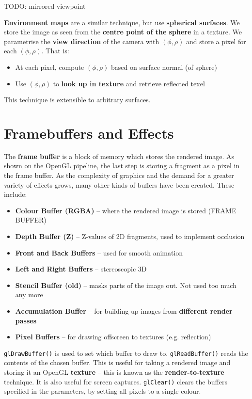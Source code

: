 \documentclass{article}
\begin{document}
TODO: mirrored viewpoint

\textbf{Environment maps} are a similar technique, but use \textbf{spherical surfaces}. We store the image as seen from the \textbf{centre point of the sphere} in a texture. We parametrise the \textbf{view direction} of the camera with $(\phi, \rho)$ and store a pixel for each $(\phi, \rho)$. That is:
\begin{itemize}
	\item At each pixel, compute $(\phi, \rho)$ based on surface normal (of sphere)
	\item Use $(\phi, \rho)$ to \textbf{look up in texture} and retrieve reflected texel
\end{itemize}
This technique is extensible to arbitrary surfaces.

\section{Framebuffers and Effects}

The \textbf{frame buffer} is a block of memory which stores the rendered image. As shown on the OpenGL pipeline, the last step is storing a fragment as a pixel in the frame buffer. As the complexity of graphics and the demand for a greater variety of effects grows, many other kinds of buffers have been created. These include:
\begin{itemize}
	\item \textbf{Colour Buffer (RGBA)} -- where the rendered image is stored (FRAME BUFFER)
	\item \textbf{Depth Buffer (Z)} -- Z-values of 2D fragments, used to implement occlusion
	\item \textbf{Front and Back Buffers} -- used for smooth animation
	\item \textbf{Left and Right Buffers} -- stereoscopic 3D
	\item \textbf{Stencil Buffer (old)} -- masks parts of the image out. Not used too much any more
	\item \textbf{Accumulation Buffer} -- for building up images from \textbf{different render passes}
	\item \textbf{Pixel Buffers} -- for drawing offscreen to textures (e.g. reflection)
\end{itemize}

\texttt{glDrawBuffer()} is used to set which buffer to draw to. \texttt{glReadBuffer()} reads the contents of the chosen buffer. This is useful for taking a rendered image and storing it an OpenGL \textbf{texture} -- this is known as the \textbf{render-to-texture} technique. It is also useful for screen captures. \texttt{glClear()} clears the buffers specified in the parameters, by setting all pixels to a single colour.
\end{document}
